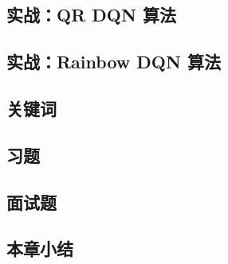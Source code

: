 \subsection{实战：QR DQN 算法}
\subsection{实战：Rainbow DQN 算法}

\subsection{关键词}
\subsection{习题}
\subsection{面试题}
\subsection{本章小结}